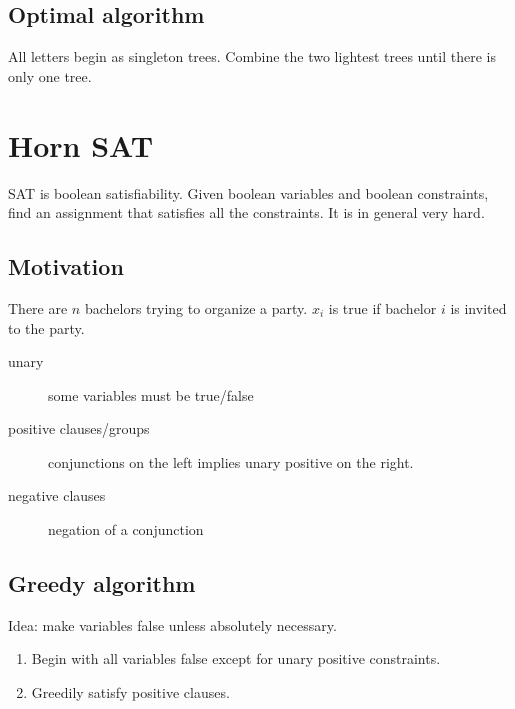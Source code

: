 \subsection{Optimal algorithm}
All letters begin as singleton trees. Combine the two lightest trees until there is only one tree.

\section{Horn SAT}
SAT is boolean satisfiability. Given boolean variables and boolean constraints, find an assignment that satisfies all the constraints. It is in general very hard.

\subsection{Motivation}
There are \(n\) bachelors trying to organize a party. \(x_i\) is true if bachelor \(i\) is invited to the party.
\begin{description}
	\item[unary] some variables must be true/false
	\item[positive clauses/groups] conjunctions on the left implies unary positive on the right.
	\item[negative clauses] negation of a conjunction
\end{description}

\subsection{Greedy algorithm}
Idea: make variables false unless absolutely necessary.

\begin{enumerate}
	\item Begin with all variables false except for unary positive constraints.
	\item Greedily satisfy positive clauses.
\end{enumerate}